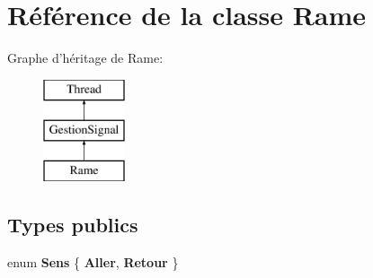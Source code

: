 \hypertarget{classRame}{
\section{Référence de la classe Rame}
\label{classRame}
}
Graphe d'héritage de Rame:\begin{figure}[H]
\begin{center}
\leavevmode
\includegraphics[height=3cm]{classRame}
\end{center}
\end{figure}
\subsection*{Types publics}
\begin{DoxyCompactItemize}
\item 
enum {\bfseries Sens} \{ {\bfseries Aller}, 
{\bfseries Retour}
 \}
\end{DoxyCompactItemize}
